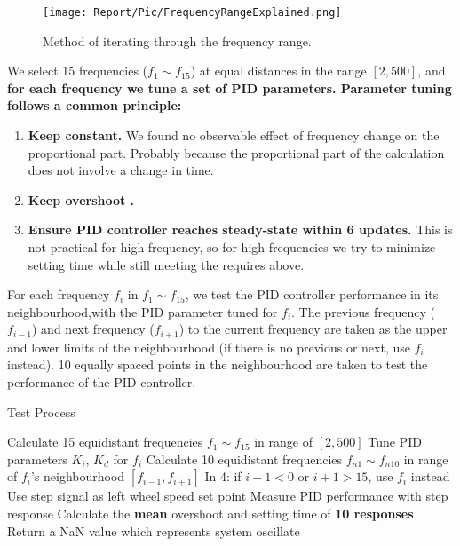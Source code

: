 \documentclass[conference]{IEEEtran}
\begin{document}
\begin{figure}[htbp]
\centerline{\texttt{[image: Report/Pic/FrequencyRangeExplained.png]}}
\caption{Method of iterating through the frequency range.}%
\label{fig_FrequencyRange}
\end{figure}

We select 15 frequencies ($f_{1}\sim f_{15}$) at equal distances in the range $[2,500]$,  and \textbf{for each frequency we tune a set of PID parameters. Parameter tuning follows a common principle:}
\begin{enumerate}
    \item\textbf{ Keep  constant. }We found no observable effect of frequency change on the proportional part. Probably because the proportional part of the calculation does not involve a change in time.
    \item\textbf{ Keep overshoot . }
    \item\textbf{ Ensure PID controller reaches steady-state within 6 updates.} This is not practical for high frequency, so for high frequencies we try to minimize setting time  while still meeting the requires above. 
\end{enumerate}


For each frequency $f_{i}$ in $f_{1}\sim f_{15}$, we test the PID controller performance in its neighbourhood,with the PID parameter tuned for $f_{i}$. The previous frequency ($f_{i-1}$) and next frequency ($f_{i+1}$) to the current frequency are taken as the upper and lower limits of the neighbourhood (if there is no previous or next, use $f_{i}$ instead). 10 equally spaced points in the neighbourhood are taken to test the performance of the PID controller.

\begin{algorithm}
	\caption{Test Process}\label{TestMethod}
	\begin{algorithmic}[1]
        \State Calculate 15  equidistant frequencies $f_{1}\sim f_{15}$ in range of $[2,500]$
                \State Tune PID parameters $K_{i}$, $K_{d}$ for $f_{i}$
                \State Calculate 10 equidistant frequencies $f_{n1}\sim f_{n10}$ in range of $f_{i}$'s neighbourhood $[f_{i-1},f_{i+1}]$
                \State In 4: if $i-1<0$ or $i+1>15$, use $f_{i}$ instead
				\State Use step signal as left wheel speed set point
                \State Measure PID performance with step response
                \State Calculate the \textbf{mean} overshoot and setting time of \textbf{10 responses}
                 Return a NaN value which represents system oscillate        
                \EndIf
			\EndFor
		\EndFor
	\end{algorithmic} 
\end{algorithm}
\end{document}
